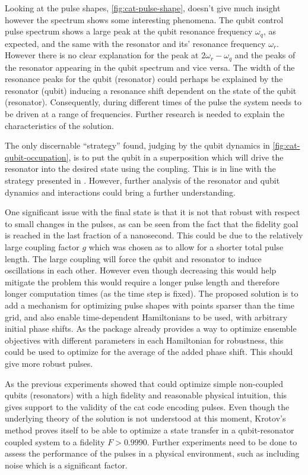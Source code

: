 \documentclass[main.tex]{subfiles}
\begin{document}
Looking at the pulse shapes, \cref{fig:cat-pulse-shape}, doesn't give much insight however the spectrum shows some interesting phenomena.
The qubit control pulse spectrum shows a large peak at the qubit resonance frequency \(\omega_q\), as expected, and the same with the resonator and its' resonance frequency \(\omega_r\).
However there is no clear explanation for the peak at \(2\omega_r-\omega_q\) and the peaks of the resonator appearing in the qubit spectrum and vice versa.
The width of the resonance peaks for the qubit (resonator) could perhaps be explained by the resonator (qubit) inducing a resonance shift dependent on the state of the qubit (resonator).
Consequently, during different times of the pulse the system needs to be driven at a range of frequencies.
Further research is needed to explain the characteristics of the solution.

The only discernable ``strategy'' found, judging by the qubit dynamics in \cref{fig:cat-qubit-occupation}, is to put the qubit in a superposition which will drive the resonator into the desired state using the coupling.
This is in line with the strategy presented in \cite{quantum dynamics}.
However, further analysis of the resonator and qubit dynamics and interactions could bring a further understanding.

One significant issue with the final state is that it is not that robust with respect to small changes in the pulses, as can be seen from the fact that the fidelity goal is reached in the last fraction of a nanosecond.
This could be due to the relatively large coupling factor \(g\) which was chosen as to allow for a shorter total pulse length.
The large coupling will force the qubit and resonator to induce oscillations in each other.
However even though decreasing this would help mitigate the problem this would require a longer pulse length and therefore longer computation times (as the time step is fixed).
The proposed solution is to add a mechanism for optimizing pulse shapes with points sparser than the time grid, and also enable time-dependent Hamiltonians to be used, with arbitrary initial phase shifts.
As the \krotov{} package already provides a way to optimize ensemble objectives with different parameters in each Hamiltonian \cite{goerz_robustness_2014} for robustness, this could be used to optimize for the average of the added phase shift.
This should give more robust pulses.

As the previous experiments showed that \krotov{} could optimize simple non-coupled qubits (resonators) with a high fidelity and reasonable physical intuition, this gives support to the validity of the cat code encoding pulses.
Even though the underlying theory of the solution is not understood at this moment, Krotov's method proves itself to be able to optimize a state transfer in a qubit-resonator coupled system to a fidelity \(F > 0.9990\).
Further experiments need to be done to assess the performance of the pulses in a physical environment, such as including noise which is a significant factor.
\end{document}
